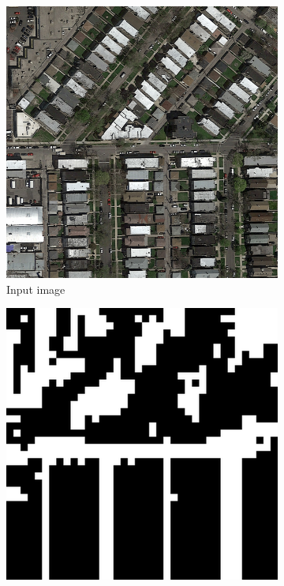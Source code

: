\documentclass[10pt,conference,compsocconf]{IEEEtran}
\begin{document}
\begin{figure}
	\centering
	\begin{subfigure}[t]{.15\textwidth}
		\includegraphics[width=1\textwidth]{figs/post_processing/input}
		\caption{Input image}
	\end{subfigure}
	\begin{subfigure}[t]{.15\textwidth}
		\includegraphics[width=1\textwidth]{figs/post_processing/cnn}

\end{subfigure}
\end{figure}
\end{document}
